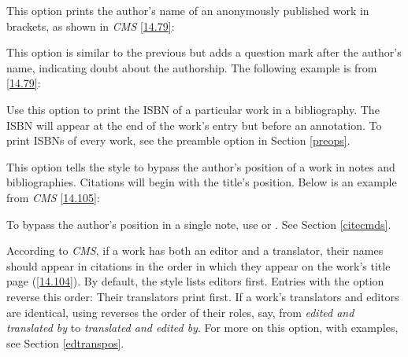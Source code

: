 \documentclass[11pt,letterpaper,oneside]{article}
\begin{document}
\begin{optionlist}


\noindent This option prints the author's name of an anonymously
published work in brackets, as shown in \textit{CMS} \ref{14.79}:

\begin{citebib}
\item \cite{horsley1796}
\end{citebib}


\noindent This option is similar to the previous but adds a question
mark after the author's name, indicating doubt about the authorship.
The following example is from \ref{14.79}:

\begin{citebib}
\item \cite{hawkes1834}
\end{citebib}


\noindent Use this option to print the ISBN of a particular work in a
bibliography. The ISBN will appear at the end of the work's entry but
before an annotation. To print ISBNs of every work, see the
 preamble option in Section \ref{preops}.


\noindent This option tells the style to bypass the author's position
of a work in notes and bibliographies. Citations will begin with the
title's position. Below is an example from \textit{CMS} \ref{14.105}:

\begin{citebib}
\item \cite{chaucer1966}
\end{citebib}

\noindent To bypass the author's position in a single note, use
 or . See Section \ref{citecmds}.


\noindent According to \textit{CMS}, if a work has both an editor and
a translator, their names should appear in citations in the order in
which they appear on the work's title page (\ref{14.104}). By default,
the style lists editors first. Entries with the option
 reverse this order: Their translators print
first. If a work's translators and editors are identical, using
 reverses the order of their roles, say, from
\textit{edited and translated by} to \textit{translated and edited
by}. For more on this option, with examples, see Section
\ref{edtranspos}.

\end{optionlist}
\end{document}
